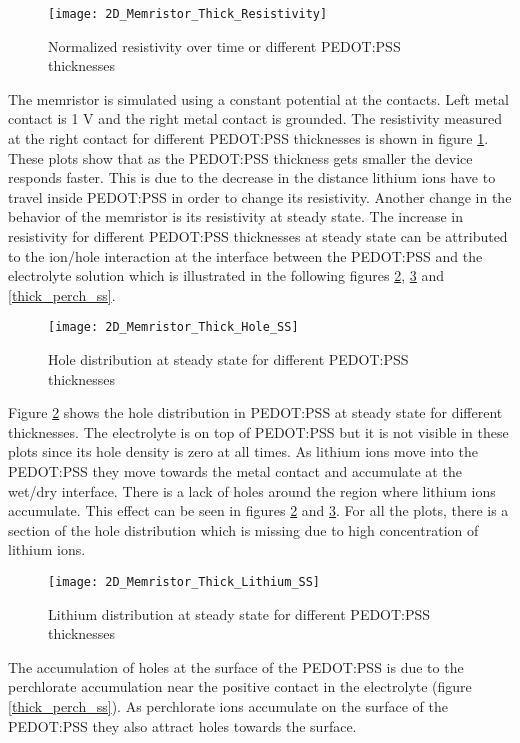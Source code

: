\begin{doublespace}
\begin{figure}[!htp]
\centering
\texttt{[image: 2D\_Memristor\_Thick\_Resistivity]}
\caption{Normalized resistivity over time or different PEDOT:PSS thicknesses} 
\label{thick_resistivity}
\end{figure}

The memristor is simulated using a constant potential at the contacts. Left metal contact is 1 V and the right metal contact is grounded. The resistivity measured at the right contact for different PEDOT:PSS thicknesses is shown in figure \ref{thick_resistivity}. These plots show that as the PEDOT:PSS thickness gets smaller the device responds faster. This is due to the decrease in the distance lithium ions have to travel inside PEDOT:PSS in order to change its resistivity. Another change in the behavior of the memristor is its resistivity at steady state. The increase in resistivity for different PEDOT:PSS thicknesses at steady state can be attributed to the ion/hole interaction at the interface between the PEDOT:PSS and the electrolyte solution which is illustrated in the following figures \ref{thick_p_ss}, \ref{thick_li_ss} and \ref{thick_perch_ss}.

\begin{figure}[!htp]
\centering
\texttt{[image: 2D\_Memristor\_Thick\_Hole\_SS]}
\caption{Hole distribution at steady state for different PEDOT:PSS thicknesses} 
\label{thick_p_ss}
\end{figure}

Figure \ref{thick_p_ss} shows the hole distribution in PEDOT:PSS at steady state for different thicknesses. The electrolyte is on top of PEDOT:PSS but it is not visible in these plots since its hole density is zero at all times. As lithium ions move into the PEDOT:PSS they move towards the metal contact and accumulate at the wet/dry interface. There is a lack of holes around the region where lithium ions accumulate. This effect can be seen in figures \ref{thick_p_ss} and  \ref{thick_li_ss}. For all the plots, there is a section of the hole distribution which is missing due to high concentration of lithium ions.

\begin{figure}[!htp]
\centering
\texttt{[image: 2D\_Memristor\_Thick\_Lithium\_SS]}
\caption{Lithium distribution at steady state for different PEDOT:PSS thicknesses} 
\label{thick_li_ss}
\end{figure}

The accumulation of holes at the surface of the PEDOT:PSS is due to the perchlorate accumulation near the positive contact in the electrolyte (figure \ref{thick_perch_ss}). As perchlorate ions accumulate on the surface of the PEDOT:PSS they also attract holes towards the surface.


\end{doublespace}
